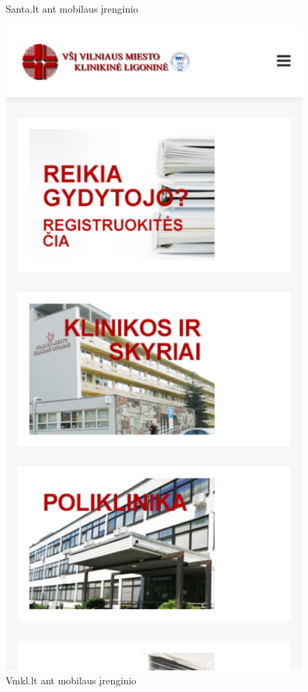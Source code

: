 \documentclass{VUMIFPSkursinis}
\begin{document}
\begin{figure}[H]
\begin{minipage}{.5\textwidth}
    	\caption{Santa.lt ant mobilaus įrenginio}
    	\label{img:santamobile}
    \end{minipage}%
    \begin{minipage}{.5\textwidth}
    	\centering
    	\includegraphics[scale=0.12]{img/VmklMobile}
    	\caption{Vmkl.lt ant mobilaus įrenginio}
    	\label{img:vmklmobile}
    \end{minipage}
\end{figure}
\end{document}
